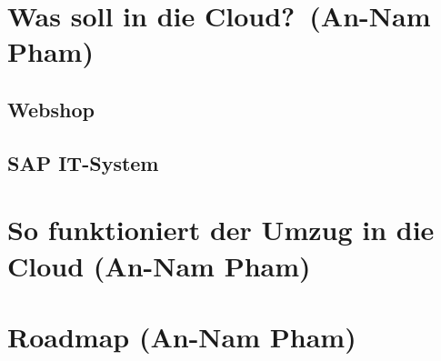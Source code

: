 \section{\glqq Was soll in die Cloud?\grqq~(An-Nam Pham)}
\subsection{Webshop}
\subsection{SAP IT-System}
\section{So funktioniert der Umzug in die Cloud (An-Nam Pham)}
\section{Roadmap (An-Nam Pham)}
